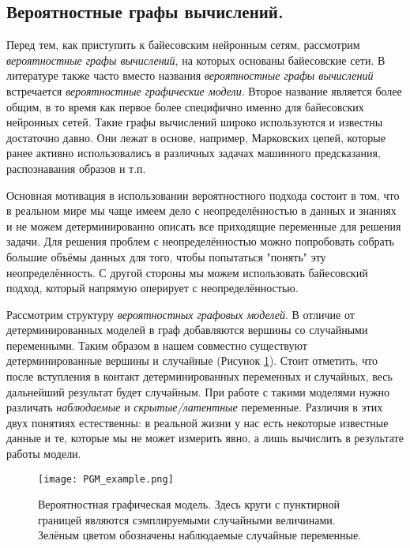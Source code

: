 \subsection{Вероятностные графы вычислений.}

Перед тем, как приступить к байесовским нейронным сетям, рассмотрим \textit{вероятностные графы вычислений}, на которых основаны
 байесовские сети. В литературе также часто вместо названия \textit{вероятностные графы вычислений} встречается \textit{вероятностные графические модели}.
 Второе название является более общим, в то время как первое более специфично именно для байесовских нейронных сетей.
 Такие графы вычислений широко используются и известны достаточно давно. Они лежат в основе, например,
 Марковских цепей, которые ранее активно использовались в различных задачах машинного предсказания, распознавания образов и т.п.

Основная мотивация в использовании вероятностного подхода состоит в том, что в реальном мире мы чаще имеем дело с неопределённостью в данных и знаниях
 и не можем детерминированно описать все приходящие переменные для решения задачи. Для решения проблем с неопределённостью
 можно попробовать собрать большие объёмы данных для того, чтобы попытаться "понять" эту неопределённость. С другой стороны
 мы можем использовать байесовский подход, который напрямую оперирует с неопределённостью.

Рассмотрим структуру \textit{вероятностных графовых моделей}. В отличие от детерминированных моделей в граф добавляются вершины
 со случайными переменными. Таким образом в нашем совместно существуют детерминированные вершины и случайные (Рисунок \ref{fig:PGM_example}). Стоит отметить,
 что после вступления в контакт детерминированных переменных и случайных, весь дальнейший результат будет случайным.
 При работе с такими моделями нужно различать \textit{наблюдаемые} и \textit{скрытые/латентные} переменные.
 Различия в этих двух понятиях естественны: в реальной жизни у нас есть некоторые известные данные и те, которые мы не может измерить явно,
 а лишь вычислить в результате работы модели.

\begin{figure}[H]
    \centering
    \texttt{[image: PGM\_example.png]}
    \caption{Вероятностная графическая модель. Здесь круги с пунктирной границей являются сэмплируемыми случайными величинами. Зелёным цветом обозначены наблюдаемые случайные переменные.}
    \label{fig:PGM_example}
\end{figure}

